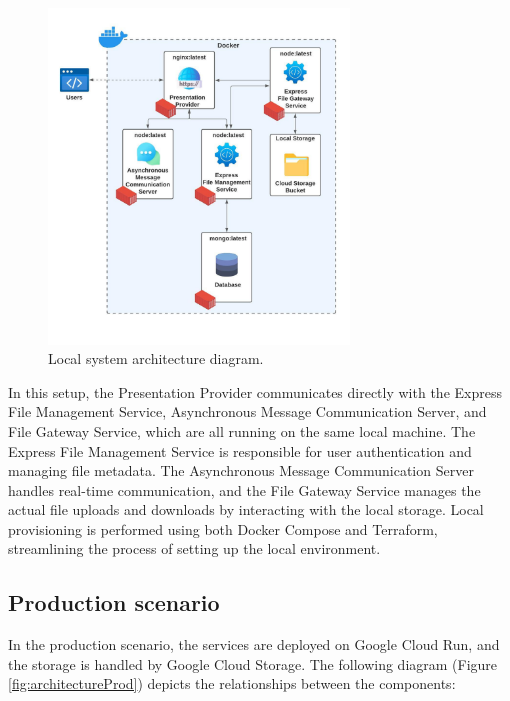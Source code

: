 \documentclass[a4paper,fleqn]{cas-dc}
\begin{document}
\begin{figure}[h]
\centering
\includegraphics[width=8cm]{architectureLocal.jpeg}
\caption{Local system architecture diagram.}
\label{fig:architectureLocal}
\end{figure}

In this setup, the Presentation Provider communicates directly with the Express File Management Service, Asynchronous Message Communication Server, and File Gateway Service, which are all running on the same local machine. The Express File Management Service is responsible for user authentication and managing file metadata. The Asynchronous Message Communication Server handles real-time communication, and the File Gateway Service manages the actual file uploads and downloads by interacting with the local storage. Local provisioning is performed using both Docker Compose and Terraform, streamlining the process of setting up the local environment.

\subsection{Production scenario}
In the production scenario, the services are deployed on Google Cloud Run, and the storage is handled by Google Cloud Storage. The following diagram (Figure \ref{fig:architectureProd}) depicts the relationships between the components:
\end{document}
